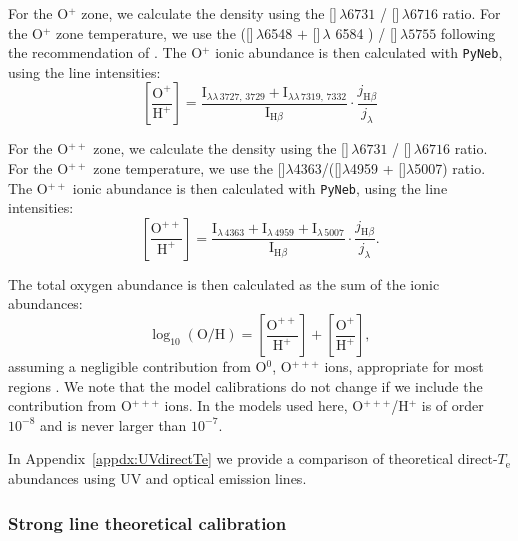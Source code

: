 \documentclass[preprint2]{aastex62}
\newcommand{\hii}{\ion{H}{2}}
\newcommand{\nii}{[\ion{N}{2}]}
\newcommand{\sii}{[\ion{S}{2}]}
\newcommand{\oiii}{[\ion{O}{3}]}
\newcommand{\Te}{\ensuremath{T_{\mathrm{e}}}\xspace}
\begin{document}
For the O$^{+}$ zone, we calculate the density using the \sii$\,\lambda 6731$ / \sii$\,\lambda 6716$ ratio. For the O$^{+}$ zone temperature, we use the (\nii$\,\lambda$6548 $+$ \nii$\,\lambda$ 6584 ) / \nii$\,\lambda 5755$ following the recommendation of \citet{Berg+2015}. The O$^{+}$ ionic abundance is then calculated with {\tt PyNeb}, using the line intensities:
\begin{equation}
    \left[ \frac{\mathrm{O}^{+}}{\mathrm{H}^{+}} \right] = \frac{\mathrm{I}_{\lambda\lambda\,3727,\,3729} + \mathrm{I}_{\lambda\lambda \,7319,\,7332}}{\mathrm{I}_{\mathrm{H}\beta}} \cdot \frac{j_{\mathrm{H}\beta}}{j_{\lambda}}
\end{equation}

For the O$^{++}$ zone, we calculate the density using the \sii$\,\lambda 6731$ / \sii$\,\lambda 6716$ ratio. For the O$^{++}$ zone temperature, we use the \oiii$\lambda$4363/(\oiii$\lambda$4959 + \oiii$\lambda$5007) ratio. The O$^{++}$ ionic abundance is then calculated with {\tt PyNeb}, using the line intensities:
\begin{equation}
    \left[ \frac{\mathrm{O}^{++}}{\mathrm{H}^{+}} \right] = \frac{\mathrm{I}_{\lambda\,4363} + \mathrm{I}_{\lambda\,4959} + \mathrm{I}_{\lambda\,5007}}{\mathrm{I}_{\mathrm{H}\beta}} \cdot \frac{j_{\mathrm{H}\beta}}{j_{\lambda}}.
\end{equation}

The total oxygen abundance is then calculated as the sum of the ionic abundances:
\begin{equation}
    \log_{10}(\mathrm{O}/\mathrm{H}) = \left[ \frac{\mathrm{O}^{++}}{\mathrm{H}^{+}} \right] + \left[ \frac{\mathrm{O}^{+}}{\mathrm{H}^{+}} \right],
\end{equation}
assuming a negligible contribution from O$^{0}$, O$^{+++}$ ions, appropriate for most \hii{} regions \citep{Berg+2016}. We note that the model calibrations do not change if we include the contribution from O$^{+++}$ ions. In the models used here, O$^{+++}$/H$^{+}$ is of order $10^{-8}$ and is never larger than $10^{-7}$.

In Appendix~\ref{appdx:UVdirectTe} we provide a comparison of theoretical direct-\Te abundances using UV and optical emission lines.

\subsubsection{Strong line theoretical calibration}\label{sec:Z:corr:strong}
\end{document}
